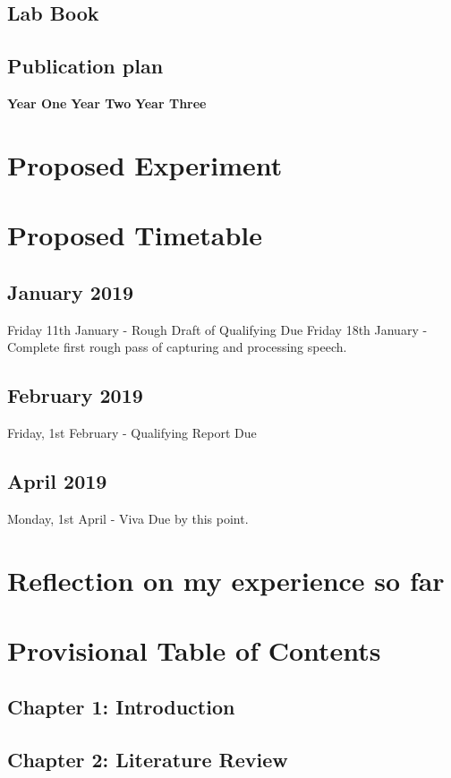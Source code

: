 \documentclass{article}
\begin{document}
	\subsection{Lab Book}
	\subsection{Publication plan}
	\textbf{Year One}
	\textbf{Year Two}
	\textbf{Year Three}
	
	\section{Proposed Experiment}	
	
	
	\section{Proposed Timetable}
	

	\subsection{January 2019}
	Friday 11th January - Rough Draft of Qualifying Due
	Friday 18th January - Complete first rough pass of capturing and processing speech.
	
	\subsection{February 2019}
	Friday, 1st February - Qualifying Report Due
	\subsection{April 2019}
	Monday, 1st April - Viva Due by this point.
	
	\section{Reflection on my experience so far}
	
	\section{Provisional Table of Contents}
	\subsection{Chapter 1: Introduction}
	\subsection{Chapter 2: Literature Review}
\end{document}
